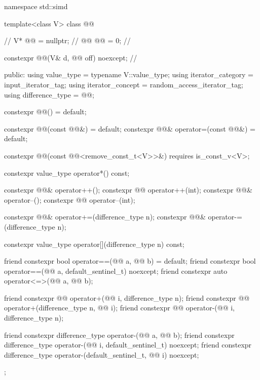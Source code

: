 %
%
%
%
\begin{codeblock}
namespace std::simd {
  template<class V>
  class @@ {                                                 // \expos
    V* @@ = nullptr;                                                 // \expos
    @@ @@ = 0;                                         // \expos

    constexpr @@(V& d, @@ off) noexcept;         // \expos

  public:
    using value_type = typename V::value_type;
    using iterator_category = input_iterator_tag;
    using iterator_concept = random_access_iterator_tag;
    using difference_type = @@;

    constexpr @@() = default;

    constexpr @@(const @@&) = default;
    constexpr @@& operator=(const @@&) = default;

    constexpr @@(const @@<remove_const_t<V>>&) requires is_const_v<V>;

    constexpr value_type operator*() const;

    constexpr @@& operator++();
    constexpr @@ operator++(int);
    constexpr @@& operator--();
    constexpr @@ operator--(int);

    constexpr @@& operator+=(difference_type n);
    constexpr @@& operator-=(difference_type n);

    constexpr value_type operator[](difference_type n) const;

    friend constexpr bool operator==(@@ a, @@ b) = default;
    friend constexpr bool operator==(@@ a, default_sentinel_t) noexcept;
    friend constexpr auto operator<=>(@@ a, @@ b);

    friend constexpr @@ operator+(@@ i, difference_type n);
    friend constexpr @@ operator+(difference_type n, @@ i);
    friend constexpr @@ operator-(@@ i, difference_type n);

    friend constexpr difference_type operator-(@@ a, @@ b);
    friend constexpr difference_type operator-(@@ i, default_sentinel_t) noexcept;
    friend constexpr difference_type operator-(default_sentinel_t, @@ i) noexcept;
  };
}
\end{codeblock}


